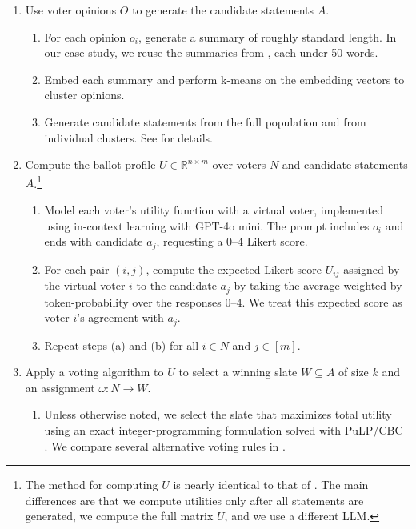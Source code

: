 \documentclass[letterpaper]{article} %
\begin{document}
\begin{enumerate}
    \item Use voter opinions \(O\) to generate the candidate statements \(A\).
    \begin{enumerate}
        \item For each opinion \(o_i\), generate a summary of roughly standard length.
        In our case study, we reuse the summaries from \citet{fish-v2}, each under 50 words.
        \item Embed each summary and perform k-means on the embedding vectors to cluster opinions.
        \item Generate candidate statements from the full population and from individual clusters.
        See  for details.
    \end{enumerate}

    \item Compute the ballot profile \(U\in \mathbb{R}^{n\times m}\) over voters \(N\) and candidate statements \(A\).\footnote{The method for computing \(U\) is nearly identical to that of \citet{fish-v2}.
    The main differences are that we compute utilities only after all statements are generated, we compute the full matrix \(U\), and we use a different LLM.}
    \begin{enumerate}
        \item Model each voter's utility function with a virtual voter, implemented using in-context learning \citep{xie-in-context-learning-2021} with GPT-4o mini.
        The prompt includes \(o_i\) and ends with candidate \(a_j\), requesting a 0--4 Likert score.
        \item For each pair \((i,j)\), compute the expected Likert score \(U_{ij}\) assigned by the virtual voter \(i\) to the candidate \(a_j\) by taking the average weighted by token-probability over the responses 0--4.
        We treat this expected score as voter \(i\)'s agreement with \(a_j\).
        \item Repeat steps (a) and (b) for all \(i\in N\) and \(j\in[m]\).
    \end{enumerate}

    \item Apply a voting algorithm to \(U\) to select a winning slate \(W\subseteq A\) of size \(k\) and an assignment \(\omega:N\to W\).
    \begin{enumerate}
        \item Unless otherwise noted, we select the slate that maximizes total utility using an exact integer-programming formulation solved with PuLP/CBC \citep{pulp, john_forrest_cbc}.
        We compare several alternative voting rules in .
    \end{enumerate}
\end{enumerate}
\end{document}
